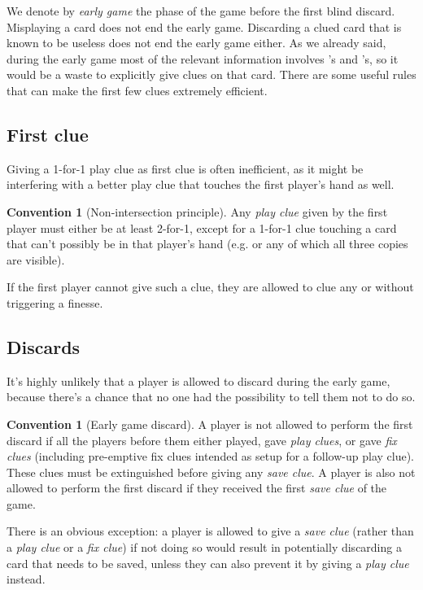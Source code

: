 \documentclass[a4paper]{article}
\theoremstyle{plain}
\theoremstyle{definition}
\newtheorem{convention}[theorem]{Convention}
\begin{document}
We denote by \emph{early game} the phase of the game before the first blind discard. Misplaying a card does not end the early game. Discarding a clued card that is known to be useless does not end the early game either. As we already said, during the early game most of the relevant information involves 's and 's, so it would be a waste to explicitly give clues on that card. There are some useful rules that can make the first few clues extremely efficient.

\subsection{First clue}

Giving a 1-for-1 play clue as first clue is often inefficient, as it might be interfering with a better play clue that touches the first player's hand as well.

\begin{convention}[Non-intersection principle]
	Any \emph{play clue} given by the first player must either be at least 2-for-1, except for a 1-for-1 clue touching a card that can't possibly be in that player's hand (e.g.  or any  of which all three copies are visible).
\end{convention}

If the first player cannot give such a clue, they are allowed to clue any  or  without triggering a finesse.

\subsection{Discards}

It's highly unlikely that a player is allowed to discard during the early game, because there's a chance that no one had the possibility to tell them not to do so.

\begin{convention}[Early game discard]
	A player is not allowed to perform the first discard if all the players before them either played, gave \emph{play clues}, or gave \emph{fix clues} (including pre-emptive fix clues intended as setup for a follow-up play clue). These clues must be extinguished before giving any \emph{save clue}. A player is also not allowed to perform the first discard if they received the first \emph{save clue} of the game.
\end{convention}

There is an obvious exception: a player is allowed to give a \emph{save clue} (rather than a \emph{play clue} or a \emph{fix clue}) if not doing so would result in potentially discarding a card that needs to be saved, unless they can also prevent it by giving a \emph{play clue} instead.
\end{document}
